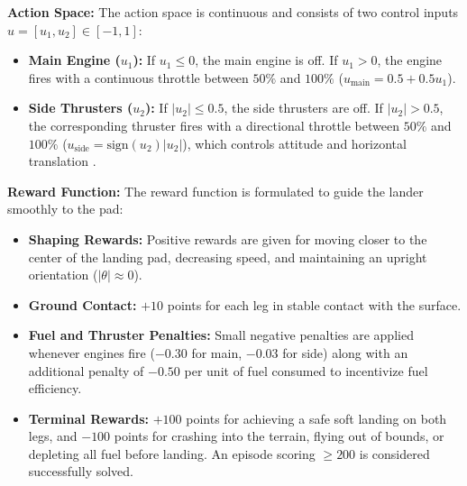 \textbf{Action Space:} The action space is continuous and consists of two control inputs $u = [u_1, u_2] \in [-1, 1]$:
\begin{itemize}[leftmargin=*,label=$\bullet$]
    \item \textbf{Main Engine ($u_1$):} If $u_1 \le 0$, the main engine is off. If $u_1 > 0$, the engine fires with a continuous throttle between $50\%$ and $100\%$ ($u_{\text{main}} = 0.5 + 0.5 u_1$).
    \item \textbf{Side Thrusters ($u_2$):} If $|u_2| \le 0.5$, the side thrusters are off. If $|u_2| > 0.5$, the corresponding thruster fires with a directional throttle between $50\%$ and $100\%$ ($u_{\text{side}} = \text{sign}(u_2)|u_2|$), which controls attitude and horizontal translation \cite{gymnasium_lunar_lander}.
\end{itemize}

\textbf{Reward Function:} The reward function is formulated to guide the lander smoothly to the pad:
\begin{itemize}[leftmargin=*,label=$\bullet$]
    \item \textbf{Shaping Rewards:} Positive rewards are given for moving closer to the center of the landing pad, decreasing speed, and maintaining an upright orientation ($|\theta| \approx 0$).
    \item \textbf{Ground Contact:} $+10$ points for each leg in stable contact with the surface.
    \item \textbf{Fuel and Thruster Penalties:} Small negative penalties are applied whenever engines fire ($-0.30$ for main, $-0.03$ for side) along with an additional penalty of $-0.50$ per unit of fuel consumed to incentivize fuel efficiency.
    \item \textbf{Terminal Rewards:} $+100$ points for achieving a safe soft landing on both legs, and $-100$ points for crashing into the terrain, flying out of bounds, or depleting all fuel before landing. An episode scoring $\ge 200$ is considered successfully solved.
\end{itemize}
